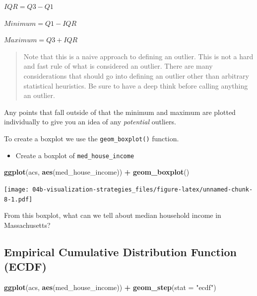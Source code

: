 \documentclass[
]{book}
\newenvironment{Shaded}{\begin{snugshade}}{\end{snugshade}}
\newcommand{\DataTypeTok}[1]{\textcolor[rgb]{0.13,0.29,0.53}{#1}}
\newcommand{\KeywordTok}[1]{\textcolor[rgb]{0.13,0.29,0.53}{\textbf{#1}}}
\newcommand{\NormalTok}[1]{#1}
\newcommand{\OperatorTok}[1]{\textcolor[rgb]{0.81,0.36,0.00}{\textbf{#1}}}
\newcommand{\StringTok}[1]{\textcolor[rgb]{0.31,0.60,0.02}{#1}}
\providecommand{\tightlist}{%
  \setlength{\itemsep}{0pt}\setlength{\parskip}{0pt}}
\begin{document}
\(IQR = Q3 - Q1\)

\(Minimum = Q1 - IQR\)

\(Maximum = Q3 + IQR\)

\begin{quote}
Note that this is a naive approach to defining an outlier. This is not a hard and fast rule of what is considered an outlier. There are many considerations that should go into defining an outlier other than arbitrary statistical heuristics. Be sure to have a deep think before calling anything an outlier.
\end{quote}

Any points that fall outside of that the minimum and maximum are plotted individually to give you an idea of any \emph{potential} outliers.

To create a boxplot we use the \texttt{geom\_boxplot()} function.

\begin{itemize}
\tightlist
\item
  Create a boxplot of \texttt{med\_house\_income}
\end{itemize}

\begin{Shaded}
\begin{Highlighting}[]
\KeywordTok{ggplot}\NormalTok{(acs, }\KeywordTok{aes}\NormalTok{(med\_house\_income)) }\OperatorTok{+}
\StringTok{  }\KeywordTok{geom\_boxplot}\NormalTok{() }
\end{Highlighting}
\end{Shaded}

\texttt{[image: 04b-visualization-strategies\_files/figure-latex/unnamed-chunk-8-1.pdf]}

From this boxplot, what can we tell about median household income in Massachusetts?

\hypertarget{empirical-cumulative-distribution-function-ecdf}{%
\subsection{Empirical Cumulative Distribution Function (ECDF)}\label{empirical-cumulative-distribution-function-ecdf}}

\begin{Shaded}
\begin{Highlighting}[]
\KeywordTok{ggplot}\NormalTok{(acs, }\KeywordTok{aes}\NormalTok{(med\_house\_income)) }\OperatorTok{+}
\StringTok{  }\KeywordTok{geom\_step}\NormalTok{(}\DataTypeTok{stat =} \StringTok{"ecdf"}\NormalTok{)}
\end{Highlighting}
\end{Shaded}
\end{document}
